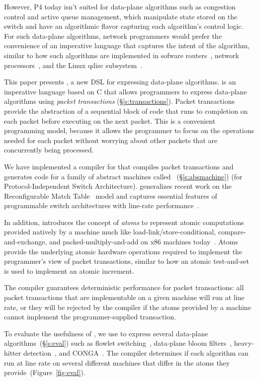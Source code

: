 However, P4 today isn't suited for data-plane algorithms such as congestion
control and active queue management, which manipulate state stored on the
switch and have an algorithmic flavor capturing each algorithm's control logic.
For such data-plane algorithms, network programmers would prefer the convenience
of an imperative language that captures the intent of the algorithm, similar to how
such algorithms are implemented in sofware routers~\cite{click}, network
processors~\cite{packetc, nova}, and the Linux qdisc subsystem~\cite{qdisc}.

This paper presents \pktlanguage, a new DSL for expressing data-plane
algorithms. \pktlanguage is an imperative language based on C that allows
programmers to express data-plane algorithms using {\em packet transactions}
(\S\ref{s:transactions}).  Packet transactions provide the abstraction of a
sequential block of code that runs to completion on each packet before
executing on the next packet. This is a convenient programming model, because it
allows the programmer to focus on the operations needed for each packet without
worrying about other packets that are concurrently being processed.

We have implemented a compiler for \pktlanguage that compiles \pktlanguage
packet transactions and generates code for a family of abstract machines called
\absmachine~(\S\ref{s:absmachine}) (for Protocol-Independent Switch
Architecture). \absmachine generalizes recent work on the Reconfigurable Match
Table~\cite{rmt} model and captures essential features of programmable switch
architectures with line-rate performance~\cite{rmt, xpliant, flexpipe}.

In addition, \absmachine introduces the concept of {\em atoms} to represent
atomic computations provided natively by a \absmachine machine much like
load-link/store-conditional, compare-and-exchange, and packed-multiply-and-add
on x86 machines today~\cite{x86_manual}.  Atoms provide the underlying atomic
hardware operations required to implement the programmer's view of packet
transactions, similar to how an atomic test-and-set is used to implement an
atomic increment.

The \pktlanguage compiler guarantees deterministic performance for packet
transactions: all packet transactions that are implementable on a given
\absmachine machine will run at line rate, or they will be rejected by the
compiler if the atoms provided by a \absmachine machine cannot implement the
programmer-supplied transaction.

To evaluate the usefulness of \pktlanguage, we use \pktlanguage to express
several data-plane algorithms~(\S\ref{s:eval}) such as flowlet
switching~\cite{flowlets}, data-plane bloom filters~\cite{bloom}, heavy-hitter
detection~\cite{opensketch}, and CONGA~\cite{conga}.  The \pktlanguage compiler
determines if each algorithm can run at line rate on several different
\absmachine machines that differ in the atoms they
provide~(Figure~\ref{fig:eval}).

